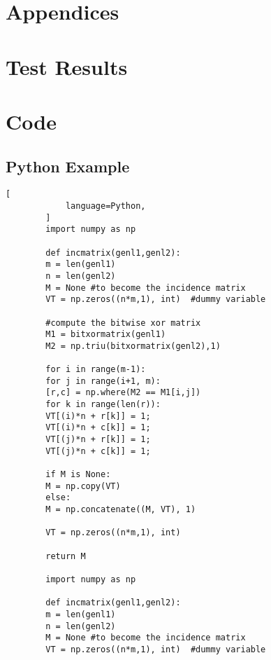 \begin{appendix}
    \chapter*{Appendices}
    \label{cha:appendices}


    \chapter{Test Results}
    \label{app:test-results}
    

    \chapter{Code}

    \section{Python Example}

    \begin{code}
        \begin{lstlisting}[
            language=Python,
        ]
        import numpy as np
        
        def incmatrix(genl1,genl2):
        m = len(genl1)
        n = len(genl2)
        M = None #to become the incidence matrix
        VT = np.zeros((n*m,1), int)  #dummy variable
        
        #compute the bitwise xor matrix
        M1 = bitxormatrix(genl1)
        M2 = np.triu(bitxormatrix(genl2),1)
        
        for i in range(m-1):
        for j in range(i+1, m):
        [r,c] = np.where(M2 == M1[i,j])
        for k in range(len(r)):
        VT[(i)*n + r[k]] = 1;
        VT[(i)*n + c[k]] = 1;
        VT[(j)*n + r[k]] = 1;
        VT[(j)*n + c[k]] = 1;
        
        if M is None:
        M = np.copy(VT)
        else:
        M = np.concatenate((M, VT), 1)
        
        VT = np.zeros((n*m,1), int)
        
        return M
        
        import numpy as np
        
        def incmatrix(genl1,genl2):
        m = len(genl1)
        n = len(genl2)
        M = None #to become the incidence matrix
        VT = np.zeros((n*m,1), int)  #dummy variable
        

\end{lstlisting}
\end{code}
\end{appendix}
